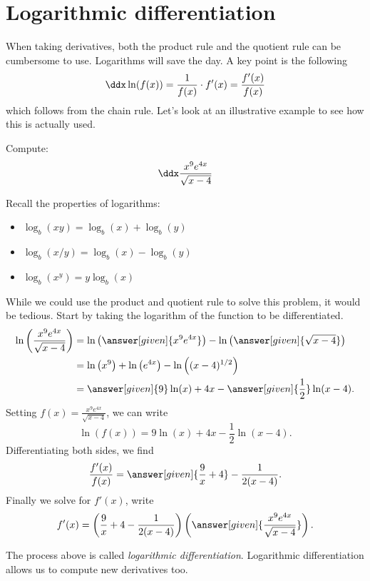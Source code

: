 \documentclass{ximera}
\begin{document}
\section{Logarithmic differentiation}


When taking derivatives, both the product rule and the quotient rule
can be cumbersome to use. Logarithms will save the day. A key point is
the following
\[
\ddx \ln(f(x)) = \frac{1}{f(x)}\cdot f'(x) = \frac{f'(x)}{f(x)}
\]
which follows from the chain rule. Let's look at an illustrative
example to see how this is actually used.

\begin{example} 
Compute:
\[
\ddx \frac{x^9e^{4x}}{\sqrt{x-4}}
\]

Recall the properties of logarithms:
\begin{itemize}
\item $\log_b(xy) = \log_b(x) + \log_b(y)$
\item $\log_b(x/y) = \log_b(x) - \log_b(y)$
\item $\log_b(x^y) = y\log_b(x)$
\end{itemize}

While we could use the product and quotient rule to solve this
problem, it would be tedious. Start by taking the logarithm of the
function to be differentiated.
\begin{align*}
\ln\left(\frac{x^9e^{4x}}{\sqrt{x-4}} \right) &= \ln\left(\answer[given]{x^9e^{4x}}\right) - \ln\left(\answer[given]{\sqrt{x-4}}\right)\\
&= \ln\left(x^9\right)+\ln\left(e^{4x}\right) - \ln\left((x-4)^{1/2}\right)\\
&= \answer[given]{9}\ln(x)+4x - \answer[given]{\frac{1}{2}}\ln(x-4).
\end{align*}
Setting $f(x) = \frac{x^9e^{4x}}{\sqrt{x-4}}$, we can write
\[
\ln(f(x)) = 9\ln(x)+4x - \frac{1}{2}\ln(x-4).
\]
Differentiating both sides, we find
\[
\frac{f'(x)}{f(x)} = \answer[given]{\frac{9}{x}+4} - \frac{1}{2(x-4)}.
\]
Finally we solve for $f'(x)$, write
\[
f'(x) = \left(\frac{9}{x}+4 - \frac{1}{2(x-4)}\right)\left(\answer[given]{\frac{x^9e^{4x}}{\sqrt{x-4}}}\right).
\]
\end{example}

The process above is called \textit{logarithmic
  differentiation}. Logarithmic differentiation allows us to compute
new derivatives too.
\end{document}
